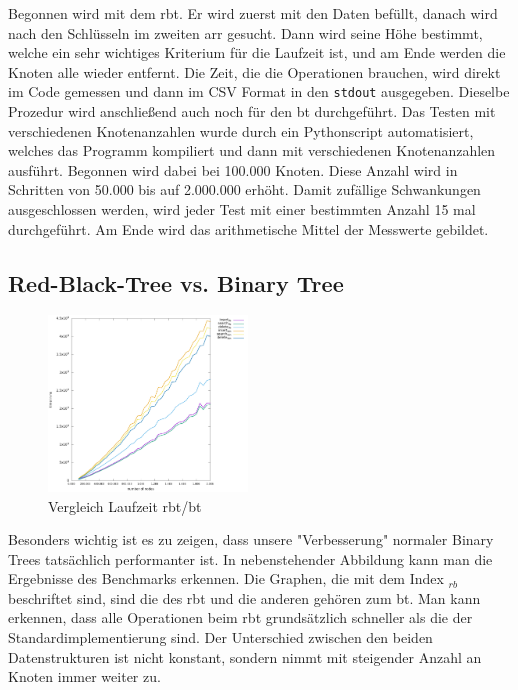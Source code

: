 \documentclass[11pt]{article}
\newcommand{\lstin}[1]{\lstinline[language=C]{#1}}
\begin{document}
Begonnen wird mit dem \gls{rbt}. Er wird zuerst mit den Daten befüllt, danach wird nach den Schlüsseln im zweiten \gls{arr} gesucht. Dann wird seine Höhe bestimmt, welche ein sehr wichtiges Kriterium für die Laufzeit ist, und am Ende werden die Knoten alle wieder entfernt.  
Die Zeit, die die Operationen brauchen, wird direkt im Code gemessen und dann im CSV Format in den \lstin{stdout} ausgegeben. Dieselbe Prozedur wird anschließend auch noch für den \gls{bt} durchgeführt.
Das Testen mit verschiedenen Knotenanzahlen wurde durch ein Pythonscript automatisiert, welches das Programm kompiliert und dann mit verschiedenen Knotenanzahlen ausführt. 
Begonnen wird dabei bei 100.000 Knoten. Diese Anzahl wird in Schritten von 50.000 bis auf 2.000.000 erhöht. Damit zufällige Schwankungen ausgeschlossen werden, wird jeder Test mit einer bestimmten Anzahl 
15 mal durchgeführt. Am Ende wird das arithmetische Mittel der Messwerte gebildet. 

\subsection{Red-Black-Tree vs. Binary Tree} \label{bbrbt}

\begin{figure}
  \includegraphics[width=200px]{../benchmark/compare_bin.png}
  \vspace{-20pt}
  \caption{Vergleich Laufzeit \gls{rbt}/\gls{bt}}
  \vspace{-15pt}
\end{figure}

Besonders wichtig ist es zu zeigen, dass unsere "Verbesserung" normaler Binary Trees tatsächlich performanter ist. In nebenstehender Abbildung kann man die Ergebnisse des Benchmarks erkennen.
Die Graphen, die mit dem Index $_{rb}$ beschriftet sind, sind die des \gls{rbt} und die anderen gehören zum \gls{bt}.
Man kann erkennen, dass alle Operationen beim \gls{rbt} grundsätzlich schneller als die der Standardimplementierung sind. 
Der Unterschied zwischen den beiden Datenstrukturen ist nicht konstant, sondern nimmt mit steigender Anzahl an Knoten immer weiter zu. 
\end{document}
